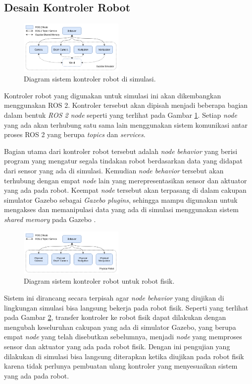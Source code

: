 \subsection{Desain Kontroler Robot}
\label{subsec:controllerdesign}

\begin{figure} [ht]
  \centering
  \includegraphics[width=0.45\textwidth]{images/simulation-controller.png}
  \caption{Diagram sistem kontroler robot di simulasi.}
  \label{fig:simulationcontroller}
\end{figure}

Kontroler robot yang digunakan untuk simulasi ini akan dikembangkan menggunakan ROS 2.
Kontroler tersebut akan dipisah menjadi beberapa bagian dalam bentuk \emph{ROS 2 node} seperti yang terlihat pada Gambar \ref{fig:simulationcontroller}.
Setiap \emph{node} yang ada akan terhubung satu sama lain menggunakan sistem komunikasi antar proses ROS 2 yang berupa \emph{topics} dan \emph{services}.

Bagian utama dari kontroler robot tersebut adalah \emph{node behavior} yang berisi program yang mengatur segala tindakan robot berdasarkan data yang didapat dari sensor yang ada di simulasi.
Kemudian \emph{node behavior} tersebut akan terhubung dengan empat \emph{node} lain yang merepresentasikan sensor dan aktuator yang ada pada robot.
Keempat \emph{node} tersebut akan terpasang di dalam cakupan simulator Gazebo sebagai \emph{Gazebo plugins},
  sehingga mampu digunakan untuk mengakses dan memanipulasi data yang ada di simulasi menggunakan sistem \emph{shared memory} pada Gazebo \citep{gazeboplugins}.

\begin{figure} [ht] \centering
  \includegraphics[width=0.45\textwidth]{images/real-robot-controller.png}
  \caption{Diagram sistem kontroler robot untuk robot fisik.}
  \label{fig:realrobotcontroller}
\end{figure}

Sistem ini dirancang secara terpisah agar \emph{node behavior} yang diujikan di lingkungan simulasi bisa langsung bekerja pada robot fisik.
Seperti yang terlihat pada Gambar \ref{fig:realrobotcontroller},
  transfer kontroler ke robot fisik dapat dilakukan dengan mengubah keseluruhan cakupan yang ada di simulator Gazebo,
  yang berupa empat \emph{node} yang telah disebutkan sebelumnya,
  menjadi \emph{node} yang memproses sensor dan aktuator yang ada pada robot fisik.
Dengan ini pengujian yang dilakukan di simulasi bisa langsung diterapkan ketika diujikan pada robot fisik karena tidak perlunya pembuatan ulang kontroler yang menyesuaikan sistem yang ada pada robot.
